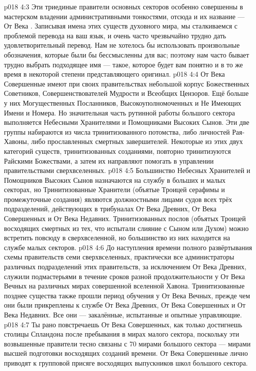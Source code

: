 \vs p018 4:3 \pc Эти триединые правители основных секторов особенно совершенны в мастерском владении административными тонкостями, отсюда и их название --- От Века . Записывая имена этих существ духовного мира, мы сталкиваемся с проблемой перевода на ваш язык, и очень часто чрезвычайно трудно дать удовлетворительный перевод. Нам не хотелось бы использовать произвольные обозначения, которые были бы бессмысленны для вас; поэтому нам часто бывает трудно выбрать подходящее имя --- такое, которое будет вам понятно и в то же время в некоторой степени представляющего оригинал.
\vs p018 4:4 \pc От Века Совершенные имеют при своих правительствах небольшой корпус Божественных Советников, Совершенствователей Мудрости и Всеобщих Цензоров. Ещё больше у них Могущественных Посланников, Высокоуполномоченных и Не Имеющих Имени и Номера. Но значительная часть рутинной работы большого сектора выполняется Небесными Хранителями и Помощниками Высоких Сынов. Эти две группы набираются из числа тринитизованного потомства, либо личностей Рая\hyp{}Хавоны, либо прославленных смертных завершителей. Некоторые из этих двух категорий существ, тринитизованных созданиями, повторно тринитизуются Райскими Божествами, а затем их направляют помогать в управлении правительствами сверхвселенных.
\vs p018 4:5 Большинство Небесных Хранителей и Помощников Высоких Сынов назначаются на службу в больших и малых секторах, но Тринитизованные Хранители (объятые Троицей серафимы и промежуточные создания) являются должностными лицами судов всех трёх подразделений, действующих в трибуналах От Века Древних, От Века Совершенных и От Века Недавних. Тринитизованных послов (объятых Троицей восходящих смертных из тех, что испытали слияние с Сыном или Духом) можно встретить повсюду в сверхвселенной, но большинство из них находится на службе малых секторов.
\vs p018 4:6 До наступления времени полного развёртывания схемы правительств семи сверхвселенных, практически все администраторы различных подразделений этих правительств, за исключением От Века Древних, служили подмастерьями в течение сроков разной продолжительности у От Века Вечных на различных мирах совершенной вселенной Хавона. Тринитизованные позднее существа также прошли период обучения у От Века Вечных, прежде чем они были прикреплены к службе От Века Древних, От Века Совершенных и От Века Недавних. Все они --- закалённые, испытанные и опытные управляющие.
\vs p018 4:7 \pc Ты рано повстречаешь От Века Совершенных, как только достигнешь столицы Спландона после пребывания в мирах малого сектора, поскольку эти возвышенные правители тесно связаны с 70 мирами большого сектора --- мирами высшей подготовки восходящих созданий времени. От Века Совершенные лично приводят к групповой присяге восходящих выпускников школ большого сектора.
